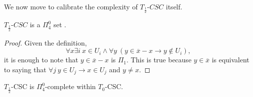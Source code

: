 \documentclass[11pt]{amsart}
\theoremstyle{remark}
\begin{document}
    We now move to calibrate the complexity of $T_{\frac12}$-$CSC$ itself. 

    \begin{proposition}
        $T_{\frac12}$-$CSC$ is a $\Pi_4^0$ set .
    \end{proposition}

    \begin{proof}
        Given the definition,
        \[\forall x \exists i ~ x\in U_i\land \forall y ~ (y\in\overline{x}-x \to y\notin U_i),\]
        it is enough to note that $y\in\overline{x}-x$ is $\Pi_1$.
        This is true because $y\in\overline{x}$ is equivalent to saying that $\forall j ~ y\in U_j \to x\in U_j$ and $y\neq x$.
    \end{proof}

    \begin{theorem}
        $T_{\frac12}$-CSC is $\Pi_4^0$-complete within $T_0$-CSC.
    \end{theorem}
\end{document}
